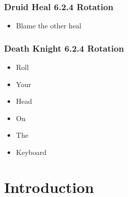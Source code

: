 \documentclass{42-en}
\begin{document}
	\subsection{Druid Heal 6.2.4 Rotation}
		\begin{itemize}\itemsep1pt
			\item Blame the other heal
		\end{itemize}
	\subsection{Death Knight 6.2.4 Rotation}
		\begin{itemize}\itemsep1pt
			\item Roll
			\item Your
			\item Head
			\item On
			\item The
			\item Keyboard
		\end{itemize}

\newpage
\chapter{Introduction}
\end{document}
